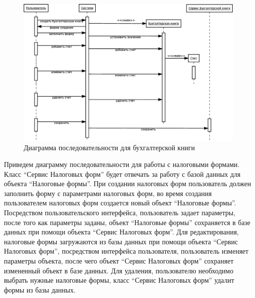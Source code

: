 \documentclass[14pt,a4paper]{reportmod}
\begin{document}
\begin{figure}
  \centering
  \includegraphics[scale=0.4]{uml/_sequence_5}
  \caption{Диаграмма последовательности для бухгалтерской книги}
  \label{pic:sequence_2}
\end{figure}

Приведем диаграмму последовательности для работы с налоговыми формами. Класс ``Сервис Налоговых форм'' будет отвечать за работу с базой данных для объекта ``Налоговые формы''. При создании налоговых форм пользователь должен заполнить форму с параметрами налоговых форм, во время создания пользователем налоговых форм создается новый объект ``Налоговые формы''. Посредством пользовательского интерфейса, пользователь задает параметры, после того как параметры заданы, объект ``Налоговые формы'' сохраняется в базе данных при помощи объекта ``Сервис Налоговых форм''. Для редактирования, налоговые формы загружаются из базы данных при помощи объекта ``Сервис Налоговых форм'', посредством интерфейса пользователя, пользователь изменяет параметры объекта, после чего объект ``Сервис Налоговых форм'' сохраняет измененный объект в базе данных. Для удаления, пользователю необходимо выбрать нужные налоговые формы, класс ``Сервис Налоговых форм'' удалит формы из базы данных.
\end{document}
